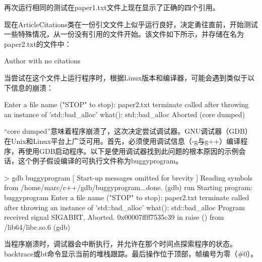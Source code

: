 再次运行相同的测试在paper1.txt文件上现在显示了正确的四个引用。


现在ArticleCitations类在一份引文文件上似乎运行良好，决定勇往直前，开始测试一些特殊情况，从一份没有引用的文件开始。该文件如下所示，并存储在名为paper2.txt的文件中：

\begin{shell}
Author with no citations
\end{shell}

当尝试在这个文件上运行程序时，根据Linux版本和编译器，可能会遇到类似于以下信息的崩溃：

\begin{shell}
Enter a file name ("STOP" to stop): paper2.txt
terminate called after throwing an instance of 'std::bad_alloc'
    what(): std::bad_alloc
Aborted (core dumped)
\end{shell}

“core dumped”意味着程序崩溃了，这次决定尝试调试器。GNU调试器（GDB）在Unix和Linux平台上广泛可用。首先，必须使用调试信息（-g与g++）编译程序，再使用GDB启动程序。以下是使用调试器找到此问题的根本原因的示例会话，这个例子假设编译的可执行文件称为buggyprogram。

\begin{shell}
> gdb buggyprogram
[ Start-up messages omitted for brevity ]
Reading symbols from /home/marc/c++/gdb/buggyprogram...done.
(gdb) run
Starting program: buggyprogram
Enter a file name ("STOP" to stop): paper2.txt
terminate called after throwing an instance of 'std::bad_alloc'
    what(): std::bad_alloc
Program received signal SIGABRT, Aborted.
0x00007ffff7535c39 in raise () from /lib64/libc.so.6
(gdb)
\end{shell}

当程序崩溃时，调试器会中断执行，并允许在那个时间点探索程序的状态。backtrace或bt命令显示当前的堆栈跟踪。最后操作位于顶部，帧编号为零（\#0）。


